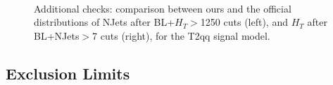         \begin{figure}
        \centering
        \hspace{-1 cm}
        ~ %
        \caption{Additional checks: comparison between ours and the official distributions of NJets after BL+$H_T$$>$1250 cuts (left), and $H_T$ after BL+NJets$>$7 cuts (right), for the T2qq signal model.}
        \label{fig:last}
        \end{figure} 
        
        
\clearpage
\subsection{Exclusion Limits}

